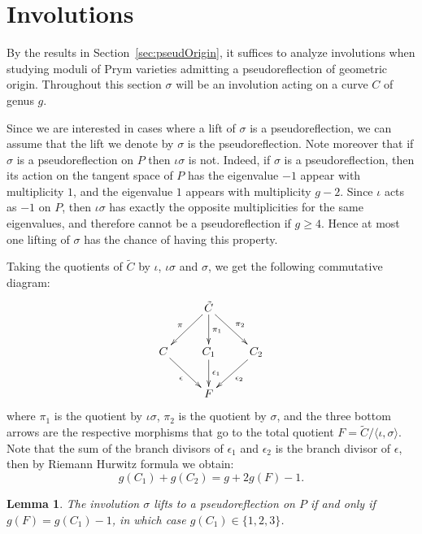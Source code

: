 \documentclass[preprint,12pt]{amsart}
\def\tC{\ensuremath{\tilde{C}}}
\theoremstyle{plain}
\newtheorem{lemma}[lemma]{Lemma}
\theoremstyle{definition}
\begin{document}
\section{Involutions}
\label{sec:involutions}

By the results in Section~\ref{sec:pseudOrigin}, 
it suffices to analyze involutions when studying moduli of Prym varieties admitting a pseudoreflection of geometric origin.
Throughout this section $\sigma$ will be an involution acting on a curve $C$ of genus $g$.

Since we are interested in cases where a lift of $\sigma$ is a pseudoreflection, we can assume that the lift we denote by $\sigma$ is the pseudoreflection.
Note moreover that if $\sigma$ is a pseudoreflection on $P$ then $\iota\sigma$ is not. Indeed, if $\sigma$ is a pseudoreflection, then its action on the tangent space of $P$ has the eigenvalue $-1$ appear with multiplicity $1$, and the eigenvalue $1$ appears with multiplicity $g-2$. Since $\iota$ acts as $-1$ on $P$, then $\iota\sigma$ has exactly the opposite multiplicities for the same eigenvalues, and therefore cannot be a pseudoreflection if $g\geq 4$.
Hence at most one lifting of $\sigma$ has the chance of having this property.

Taking the quotients of $\tC$ by $\iota$, $\iota\sigma$ and $\sigma$, we get the following commutative diagram:
\begin{equation}\label{diagram}
 \xymatrix{
&\tC\ar[dl]_{\pi}\ar[d]^{\pi_1}\ar[dr]^{\pi_2}&\\
C\ar[dr]_{\epsilon}&C_1\ar[d]^{\epsilon_1}&C_2\ar[dl]^{\epsilon_2}\\
&F&}
\end{equation}
where $\pi_1$ is the quotient by $\iota\sigma$, $\pi_2$ is the quotient by $\sigma$, and the three bottom arrows are the respective morphisms that go to the total quotient $F=\tC/\langle\iota,\sigma\rangle$.
Note that the sum of the branch divisors of $\epsilon_1 $ and $\epsilon_2$ is the branch divisor of $\epsilon $, then by Riemann Hurwitz formula we obtain:
\begin{equation} \label{sum_of_genus}
g(C_1)+g(C_2)=g+2g(F)-1.
\end{equation}

\begin{lemma}\label{involution}
The involution $\sigma$ lifts to a pseudoreflection on $P$ if and only if $g(F)=g(C_1)-1$, in which case $g(C_1)\in\{1,2,3\}$.
\end{lemma}
\end{document}
